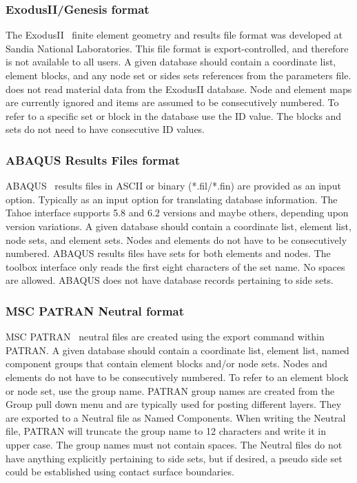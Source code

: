 \subsubsection{\textsf{ExodusII/Genesis} format}
\label{sect.file.exodusII}
The \textsf{ExodusII}~\cite{ExodusII} finite element geometry and results file 
format was developed at Sandia National Laboratories. This file format 
is export-controlled, and therefore is not available to all users.
A given database should contain a coordinate list, element blocks,
and any node set or sides sets references from the 
parameters file.  \tahoe does not read material data from the 
\textsf{ExodusII} database. 
Node and element maps are currently ignored and items are assumed to be
consecutively numbered.  To refer to a specific set or block in the
database use the ID value.  The blocks and sets do not need to have
consecutive ID values.

\subsubsection{\textsf{ABAQUS Results Files} format}
\label{sect.file.abaqus}
\textsf{ABAQUS}~\cite{ABAQUS62} results files in ASCII or binary (*.fil/*.fin) 
are provided as an input option. Typically as an input option for translating 
database information. The Tahoe interface supports 5.8 and 6.2 versions and 
maybe others, depending upon version variations. A given database should 
contain a coordinate list, element list, node sets, and element sets. Nodes 
and elements do not have to be consecutively numbered. ABAQUS results files 
have sets for both elements and nodes. The toolbox interface only reads 
the first eight characters of the set name. No spaces are allowed. ABAQUS 
does not have database records pertaining to side sets. 

\subsubsection{\textsf{MSC PATRAN Neutral} format}
\label{sect.file.patran}
\textsf{MSC PATRAN}~\cite{PATRAN2001} neutral files are created using the 
export command within PATRAN. A given database should contain a coordinate 
list, element list, named component groups that contain element blocks 
and/or node sets. Nodes and elements do not have to be consecutively 
numbered. To refer to an element block or node set, use the group name. 
PATRAN group names are created from the Group pull down menu and are 
typically used for posting different layers. They are exported to a Neutral 
file as Named Components. When writing the Neutral file, PATRAN will 
truncate the group name to 12 characters and write it in upper case. The
group names must not contain spaces. The Neutral files do not have anything 
explicitly pertaining to side sets, but if desired, a pseudo side set could 
be established using contact surface boundaries.


